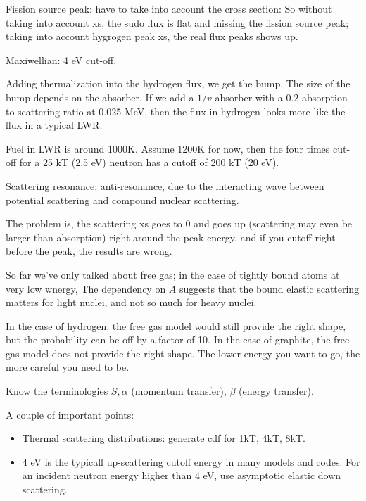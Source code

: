 \documentclass{school-22.211-notes}
\begin{document}
Fission source peak: have to take into account the cross section: 
So without taking into account xs, the sudo flux is flat and missing the fission source peak; taking into account hygrogen peak xs, the real flux peaks shows up. 


Maxiwellian: 4 eV cut-off. 


Adding thermalization into the hydrogen flux, we get the bump. The size of the bump depends on the absorber. If we add a $1/v$ absorber with a 0.2 absorption-to-scattering ratio at 0.025 MeV, then the flux in hydrogen looks more like the flux in a typical LWR. 


Fuel in LWR is around 1000K. Assume 1200K for now, then the four times cut-off for a 25 kT (2.5 eV) neutron has a cutoff of 200 kT (20 eV). 

Scattering resonance: anti-resonance, due to the interacting wave between potential scattering and compound nuclear scattering. 

The problem is, the scattering xs goes to 0 and goes up (scattering may even be larger than absorption) right around the peak energy, and if you cutoff right before the peak, the results are wrong. 

So far we've only talked about free gas; in the case of tightly bound atoms at very low wnergy, 
The dependency on $A$ suggests that the bound elastic scattering matters for light nuclei, and not so much for heavy nuclei. 

In the case of hydrogen, the free gas model would still provide the right shape, but the probability can be off by a factor of 10. In the case of graphite, the free gas model does not provide the right shape. The lower energy you want to go, the more careful you need to be. 

Know the terminologies $S, \alpha$ (momentum transfer), $\beta$ (energy transfer). 

A couple of important points:
\begin{itemize}
\item Thermal scattering distributions: generate cdf for 1kT, 4kT, 8kT.  
\item 4 eV is the typicall up-scattering cutoff energy in many models and codes. For an incident neutron energy higher than 4 eV, use asymptotic elastic down scattering. 
\end{itemize}
\end{document}
